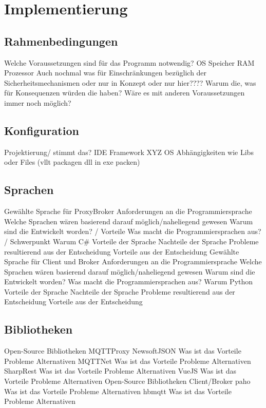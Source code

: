 \chapter{Implementierung}
\section{Rahmenbedingungen}
    Welche Voraussetzungen sind für das Programm notwendig?
        OS
        Speicher
        RAM
        Prozessor
        Auch nochmal was für Einschränkungen bezüglich der Sicherheitsmechanismen oder nur in Konzept oder nur hier????
    Warum die, was für Konsequenzen würden die haben?
    Wäre es mit anderen Voraussetzungen immer noch möglich?


\section{Konfiguration} Projektierung/ stimmt das?
    IDE
    Framework XYZ
    OS
    Abhängigkeiten wie Libs oder Files (vllt packagen dll in exe packen)

\section{Sprachen}
    Gewählte Sprache für ProxyBroker
        Anforderungen an die Programmiersprache
        Welche Sprachen wären basierend darauf möglich/naheliegend gewesen
            Warum sind die Entwickelt worden? / Vorteile
            Was macht die Programmiersprachen aus? / Schwerpunkt
        Warum C#
            Vorteile der Sprache
            Nachteile der Sprache 
            Probleme resultierend aus der Entscheidung
            Vorteile aus der Entscheidung
    Gewählte Sprache für Client und Broker
        Anforderungen an die Programmiersprache
        Welche Sprachen wären basierend darauf möglich/naheliegend gewesen
            Warum sind die Entwickelt worden? 
            Was macht die Programmiersprachen aus?
        Warum Python
            Vorteile der Sprache
            Nachteile der Sprache 
            Probleme resultierend aus der Entscheidung
            Vorteile aus der Entscheidung
     
\section{Bibliotheken}
    Open-Source Bibliotheken MQTTProxy
        NewsoftJSON
            Was ist das
            Vorteile
            Probleme
            Alternativen
        MQTTNet
            Was ist das
            Vorteile
            Probleme
            Alternativen
        SharpRest
            Was ist das
            Vorteile
            Probleme
            Alternativen
        VueJS
            Was ist das
            Vorteile
            Probleme
            Alternativen
    Open-Source Bibliotheken Client/Broker
        paho
            Was ist das
            Vorteile
            Probleme
            Alternativen
        hbmqtt
            Was ist das
            Vorteile
            Probleme
            Alternativen